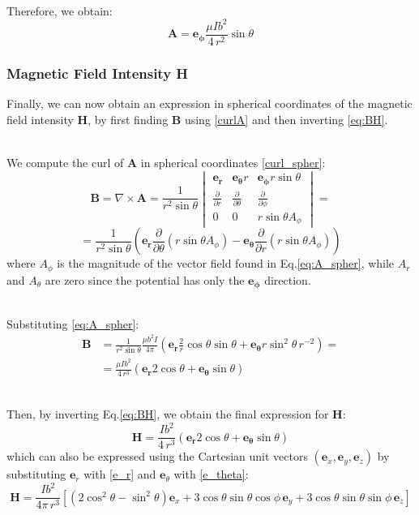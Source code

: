 \documentclass[main]{subfiles}
\begin{document}
\noindent\\
Therefore, we obtain:
\begin{equation}
 \mathbf{A} = \mathbf{e_\phi} \frac{\mu I b^2}{4 \, r^2} 
 \sin \theta
    \label{eq:A_spher}
\end{equation}

\subsubsection{Magnetic Field Intensity H}
Finally, we can now obtain an expression in spherical 
coordinates of the magnetic field intensity 
$\mathbf{H}$, by first finding $\mathbf{B}$ using 
\ref{curlA} and then inverting \ref{eq:BH}.

\noindent\\
We compute the curl of $\mathbf{A}$ in spherical 
coordinates \eqref{curl_spher}:
\[
 \mathbf{B} = \nabla \times \mathbf{A} = \frac{1}{r^2 \sin \theta} 
    \begin{vmatrix}
 \mathbf{e_r} & \mathbf{e_\theta} r & \mathbf{e_\phi} r \sin \theta \\
 \frac{\partial}{\partial r} & \frac{\partial}{\partial \theta} & 
 \frac{\partial}{\partial \phi} \\
        0 & 0 & r \sin \theta A_\phi
    \end{vmatrix} =
\]
\[
 = \frac{1}{r^2 \sin \theta} \left( \mathbf{e_r} 
 \frac{\partial}{\partial \theta} (r \sin \theta A_\phi) 
 - \mathbf{e_\theta} \frac{\partial}{\partial r} 
 (r \sin \theta A_\phi) \right)
\]
where $A_\phi$ is the magnitude of the vector field 
found in Eq.\ref{eq:A_spher}, while $A_r$ and $A_\theta$ 
are zero since the potential has only the 
$\mathbf{e_\phi}$ direction.

\noindent\\
Substituting \ref{eq:A_spher}:
\[
\begin{aligned}
 \mathbf{B}&= \frac{1}{r^2 \sin \theta} 
 \frac{\mu b^2 I}{4 \pi} \left(\mathbf{e_r} 
 \frac{2}{r} \cos \theta \sin \theta + 
 \mathbf{e_\theta} r \sin^2 \theta \, r^{-2}\right) =
    \\
     &= \frac{\mu I b^2 }{4 \, r^3} \left( 
 \mathbf{e_r} 2 \cos \theta + \mathbf{e_\theta} 
 \sin \theta \right)
\end{aligned}
\]

\noindent\\
Then, by inverting Eq.\ref{eq:BH}, we obtain the 
final expression for $\mathbf{H}$:
\begin{equation}
 \mathbf{H} = \frac{ I b^2}{4 \, r^3} \left( 
 \mathbf{e_r} 2 \cos \theta + \mathbf{e_\theta} 
 \sin \theta \right)
    \label{eq:H_spheric}
\end{equation}
which can also be expressed using the Cartesian unit 
vectors \((\mathbf{e}_x, \mathbf{e}_y, \mathbf{e}_z)\) 
by substituting \(\mathbf{e}_r\) with \ref{e_r} and 
\(\mathbf{e}_\theta\) with \ref{e_theta}:
\[
 \mathbf{H} = \frac{I b^2}{4 \pi \, r^3} \left[ 
 (2\cos^2\theta - \sin^2\theta) \mathbf{e}_x 
 + 3\cos\theta \sin\theta \cos\phi \, \mathbf{e}_y 
 + 3\cos\theta \sin\theta \sin\phi \, \mathbf{e}_z \right]
\]
\end{document}
